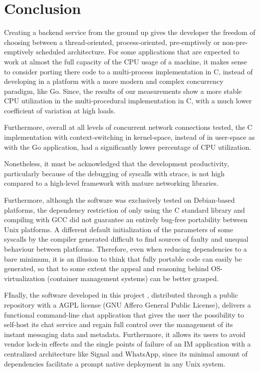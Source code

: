 \section{Conclusion}
Creating a backend service from the ground up gives the developer the freedom of choosing between a thread-oriented, process-oriented, pre-emptively or non-pre-emptively scheduled architecture. For some applications that are expected to work at almost the full capacity of the CPU usage of a machine, it makes sense to consider porting there code to a multi-process implementation in C, instead of developing in a platform with a more modern and complex concurrency paradigm, like Go. Since, the results of our measurements show a more stable CPU utilization in the multi-procedural implementation in C, with a much lower coefficient of variation at high loads. 

Furthermore, overall at all levels of concurrent network connections tested, the C implementation with context-switching in kernel-space, instead of in user-space as with the Go application, had a significantly lower percentage of CPU utilization. %

 Nonetheless, it must be acknowledged that the development productivity, particularly because of the debugging of syscalls with strace, is not high compared to a high-level framework with mature networking libraries.

Furthermore, although the software was exclusively tested on Debian-based platforms, the dependency restriction of only using the C standard library and compiling with GCC did not guarantee an entirely bug-free portability between Unix platforms. A different default initialization of the parameters of some syscalls by the compiler generated difficult to find sources of faulty and unequal behaviour between platforms. Therefore, even when reducing dependencies to a bare minimum, it is an illusion to think that fully portable code can easily be generated, so that to some extent the appeal and reasoning behind OS-virtualization (container management systems) can be better grasped.


FInally, the software developed in this project \cite{Rodriguez2022}, distributed through a public repository with a AGPL license (GNU Affero General Public License), delivers a functional command-line chat application that gives the user the possibility to self-host its chat service and regain full control over the management of its instant messaging data and metadata. Furthermore, it allows its users to avoid vendor lock-in effects and the single points of failure of an IM application with a centralized architecture like Signal and WhatsApp, since its minimal amount of dependencies facilitate a prompt native deployment in any Unix system.